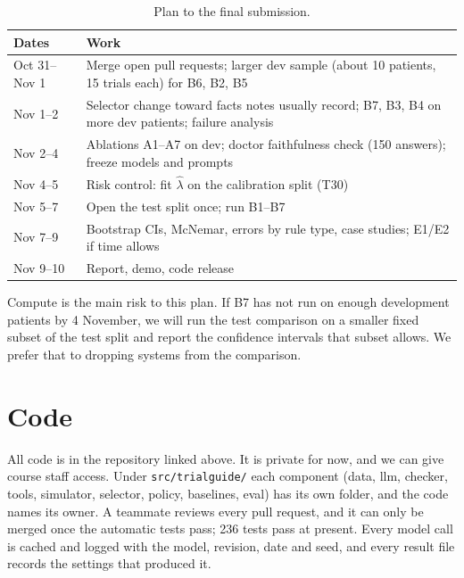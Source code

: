 \documentclass[10pt,a4paper,twocolumn]{article}
\begin{document}
\begin{table}[H]
\centering\footnotesize
\begin{tabularx}{\columnwidth}{@{}P{1.45cm}L@{}}
\toprule
\textbf{Dates} & \textbf{Work}\\
\midrule
Oct 31--Nov 1 & Merge open pull requests; larger dev sample (about 10 patients, 15 trials each) for B6, B2, B5\\
Nov 1--2 & Selector change toward facts notes usually record; B7, B3, B4 on more dev patients; failure analysis\\
Nov 2--4 & Ablations A1--A7 on dev; doctor faithfulness check (150 answers); freeze models and prompts\\
Nov 4--5 & Risk control: fit \(\hat\lambda\) on the calibration split (T30)\\
Nov 5--7 & Open the test split once; run B1--B7\\
Nov 7--9 & Bootstrap CIs, McNemar, errors by rule type, case studies; E1/E2 if time allows\\
Nov 9--10 & Report, demo, code release\\
\bottomrule
\end{tabularx}
\caption{Plan to the final submission.}
\label{tab:plan}
\end{table}

Compute is the main risk to this plan. If B7 has not run on enough development patients by 4 November, we will run the test comparison on a smaller fixed subset of the test split and report the confidence intervals that subset allows. We prefer that to dropping systems from the comparison.

\section{Code}
All code is in the repository linked above. It is private for now, and we can give course staff access. Under \texttt{src/trialguide/} each component (data, llm, checker, tools, simulator, selector, policy, baselines, eval) has its own folder, and the code names its owner. A teammate reviews every pull request, and it can only be merged once the automatic tests pass; 236 tests pass at present. Every model call is cached and logged with the model, revision, date and seed, and every result file records the settings that produced it.
\end{document}
